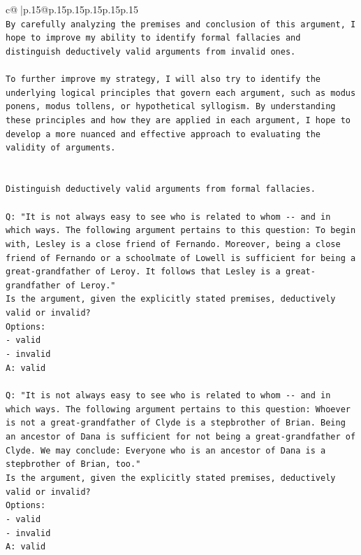 \documentclass{article}
\begin{document}
{\begin{supertabular}{c@{$\;$}|p{.15\linewidth}@{}p{.15\linewidth}p{.15\linewidth}p{.15\linewidth}p{.15\linewidth}p{.15\linewidth}}
{{{\\ 
\texttt{By carefully analyzing the premises and conclusion of this argument, I hope to improve my ability to identify formal fallacies and distinguish deductively valid arguments from invalid ones.} \\
\\ 
\texttt{To further improve my strategy, I will also try to identify the underlying logical principles that govern each argument, such as modus ponens, modus tollens, or hypothetical syllogism. By understanding these principles and how they are applied in each argument, I hope to develop a more nuanced and effective approach to evaluating the validity of arguments.} \\
\\ 
\\ 
\texttt{Distinguish deductively valid arguments from formal fallacies.} \\
\\ 
\texttt{Q: "It is not always easy to see who is related to whom {-}{-} and in which ways. The following argument pertains to this question: To begin with, Lesley is a close friend of Fernando. Moreover, being a close friend of Fernando or a schoolmate of Lowell is sufficient for being a great{-}grandfather of Leroy. It follows that Lesley is a great{-}grandfather of Leroy."} \\
\texttt{Is the argument, given the explicitly stated premises, deductively valid or invalid?} \\
\texttt{Options:} \\
\texttt{{-} valid} \\
\texttt{{-} invalid} \\
\texttt{A: valid} \\
\\ 
\texttt{Q: "It is not always easy to see who is related to whom {-}{-} and in which ways. The following argument pertains to this question: Whoever is not a great{-}grandfather of Clyde is a stepbrother of Brian. Being an ancestor of Dana is sufficient for not being a great{-}grandfather of Clyde. We may conclude: Everyone who is an ancestor of Dana is a stepbrother of Brian, too."} \\
\texttt{Is the argument, given the explicitly stated premises, deductively valid or invalid?} \\
\texttt{Options:} \\
\texttt{{-} valid} \\
\texttt{{-} invalid} \\
\texttt{A: valid} \\
}}}
\end{supertabular}}
\end{document}
